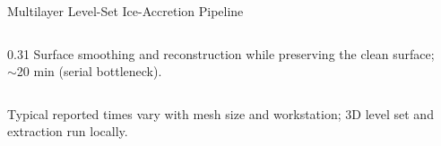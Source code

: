\begin{frame}[t]{Multilayer Level-Set Ice-Accretion Pipeline}
\begin{columns}[T,onlytextwidth]
\begin{column}{0.31\textwidth}
  Surface smoothing and reconstruction while preserving the clean surface;\\ $\sim$20 min (serial bottleneck).
 \end{column}
\end{columns}
\vspace{0.32cm}
\begin{center}
\end{center}
\vfill
{\centering\tiny\color{gray}
Typical reported times vary with mesh size and workstation; 3D level set and extraction run locally.\par}
\end{frame}

